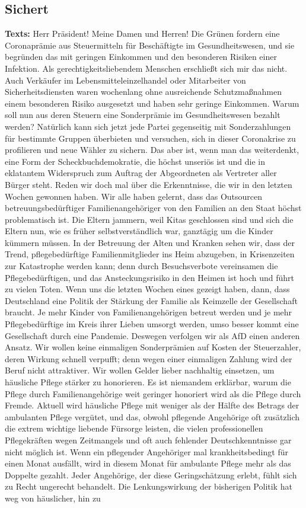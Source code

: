 \documentclass{article}
\begin{document}
\subsection{Sichert}
\noindent\textbf{Texts:} Herr Präsident! Meine Damen und Herren! Die Grünen fordern eine Coronaprämie aus Steuermitteln für Beschäftigte im Gesundheitswesen, und sie begründen das mit geringen Einkommen und den besonderen Risiken einer Infektion. Als gerechtigkeitsliebendem Menschen erschließt sich mir das nicht. Auch Verkäufer im Lebensmitteleinzelhandel oder Mitarbeiter von Sicherheitsdiensten waren wochenlang ohne ausreichende Schutzmaßnahmen einem besonderen Risiko ausgesetzt und haben sehr geringe Einkommen. Warum soll nun aus deren Steuern eine Sonderprämie im Gesundheitswesen bezahlt werden? Natürlich kann sich jetzt jede Partei gegenseitig mit Sonderzahlungen für bestimmte Gruppen überbieten und versuchen, sich in dieser Coronakrise zu profilieren und neue Wähler zu sichern. Das aber ist, wenn man das weiterdenkt, eine Form der Scheckbuchdemokratie, die höchst unseriös ist und die in eklatantem Widerspruch zum Auftrag der Abgeordneten als Vertreter aller Bürger steht.  Reden wir doch mal über die Erkenntnisse, die wir in den letzten Wochen gewonnen haben.  Wir alle haben gelernt, dass das Outsourcen betreuungsbedürftiger Familienangehöriger von den Familien an den Staat höchst problematisch ist. Die Eltern jammern, weil Kitas geschlossen sind und sich die Eltern nun, wie es früher selbstverständlich war, ganztägig um die Kinder kümmern müssen. In der Betreuung der Alten und Kranken sehen wir, dass der Trend, pflegebedürftige Familienmitglieder ins Heim abzugeben, in Krisenzeiten zur Katastrophe werden kann; denn durch Besuchsverbote vereinsamen die Pflegebedürftigen, und das Ansteckungsrisiko in den Heimen ist hoch und führt zu vielen Toten. Wenn uns die letzten Wochen eines gezeigt haben, dann, dass Deutschland eine Politik der Stärkung der Familie als Keimzelle der Gesellschaft braucht. Je mehr Kinder von Familienangehörigen betreut werden und je mehr Pflegebedürftige im Kreis ihrer Lieben umsorgt werden, umso besser kommt eine Gesellschaft durch eine Pandemie.  Deswegen verfolgen wir als AfD einen anderen Ansatz. Wir wollen keine einmaligen Sonderprämien auf Kosten der Steuerzahler, deren Wirkung schnell verpufft; denn wegen einer einmaligen Zahlung wird der Beruf nicht attraktiver. Wir wollen Gelder lieber nachhaltig einsetzen, um häusliche Pflege stärker zu honorieren. Es ist niemandem erklärbar, warum die Pflege durch Familienangehörige weit geringer honoriert wird als die Pflege durch Fremde.  Aktuell wird häusliche Pflege mit weniger als der Hälfte des Betrags der ambulanten Pflege vergütet, und das, obwohl pflegende Angehörige oft zusätzlich die extrem wichtige liebende Fürsorge leisten, die vielen professionellen Pflegekräften wegen Zeitmangels  und oft auch fehlender Deutschkenntnisse gar nicht möglich ist.  Wenn ein pflegender Angehöriger mal krankheitsbedingt für einen Monat ausfällt, wird in diesem Monat für ambulante Pflege mehr als das Doppelte gezahlt. Jeder Angehörige, der diese Geringschätzung erlebt, fühlt sich zu Recht ungerecht behandelt. Die Lenkungswirkung der bisherigen Politik hat weg von häuslicher, hin zu 
\end{document}
